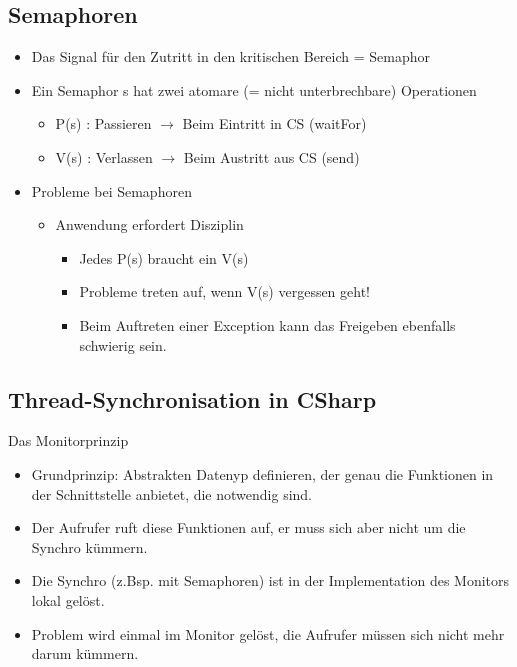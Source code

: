  \subsection{Semaphoren }
 \begin{itemize}
   \item Das Signal für den Zutritt in den kritischen Bereich = Semaphor
   \item Ein Semaphor s hat zwei atomare (= nicht unterbrechbare)
     Operationen
   \begin{itemize}
     \item P(s) : Passieren $\rightarrow$ Beim Eintritt in CS (waitFor)
     \item V(s) : Verlassen $\rightarrow$ Beim Austritt aus CS (send)
   \end{itemize}
   \item Probleme bei Semaphoren
   \begin{itemize}
    \item Anwendung erfordert Disziplin
    \begin{itemize}
      \item Jedes P(s) braucht ein V(s)
      \item Probleme treten auf, wenn V(s) vergessen geht!
      \item Beim Auftreten einer Exception kann das Freigeben ebenfalls
      schwierig sein. 
    \end{itemize}
   \end{itemize}
 \end{itemize}
 
 \subsection{Thread-Synchronisation in CSharp }
 Das Monitorprinzip
 \begin{itemize}
   \item Grundprinzip: Abstrakten Datenyp definieren, der genau die Funktionen
   in der Schnittstelle anbietet, die notwendig sind. 
   \item Der Aufrufer ruft diese Funktionen auf, er muss sich aber nicht um die
   Synchro kümmern. 
   \item Die Synchro (z.Bsp. mit Semaphoren) ist in der Implementation des
   Monitors lokal gelöst. 
   \item Problem wird einmal im Monitor gelöst, die Aufrufer müssen sich nicht
   mehr darum kümmern. 
 \end{itemize}
 
